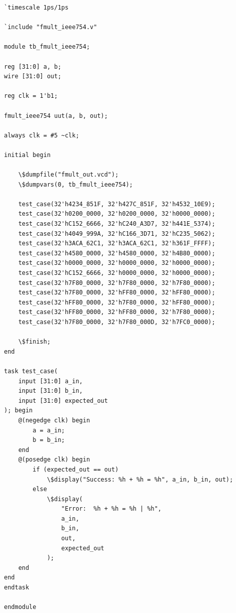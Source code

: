 \documentclass{article}
\begin{document}
\begin{lstlisting}
`timescale 1ps/1ps

`include "fmult_ieee754.v"

module tb_fmult_ieee754;

reg [31:0] a, b;
wire [31:0] out;

reg clk = 1'b1;

fmult_ieee754 uut(a, b, out);

always clk = #5 ~clk;

initial begin

	\$dumpfile("fmult_out.vcd");
	\$dumpvars(0, tb_fmult_ieee754);

    test_case(32'h4234_851F, 32'h427C_851F, 32'h4532_10E9);
    test_case(32'h0200_0000, 32'h0200_0000, 32'h0000_0000);
    test_case(32'hC152_6666, 32'hC240_A3D7, 32'h441E_5374);
    test_case(32'h4049_999A, 32'hC166_3D71, 32'hC235_5062);
    test_case(32'h3ACA_62C1, 32'h3ACA_62C1, 32'h361F_FFFF);
    test_case(32'h4580_0000, 32'h4580_0000, 32'h4B80_0000);
    test_case(32'h0000_0000, 32'h0000_0000, 32'h0000_0000);
    test_case(32'hC152_6666, 32'h0000_0000, 32'h0000_0000);
    test_case(32'h7F80_0000, 32'h7F80_0000, 32'h7F80_0000);
    test_case(32'h7F80_0000, 32'hFF80_0000, 32'hFF80_0000);
    test_case(32'hFF80_0000, 32'h7F80_0000, 32'hFF80_0000);
    test_case(32'hFF80_0000, 32'hFF80_0000, 32'h7F80_0000);
    test_case(32'h7F80_0000, 32'h7F80_000D, 32'h7FC0_0000);

    \$finish;
end

task test_case(
    input [31:0] a_in,
    input [31:0] b_in,
    input [31:0] expected_out
); begin
    @(negedge clk) begin
        a = a_in;
        b = b_in;
    end
    @(posedge clk) begin
        if (expected_out == out)
            \$display("Success: %h + %h = %h", a_in, b_in, out);
        else
            \$display(
                "Error:  %h + %h = %h | %h",
                a_in,
                b_in,
                out,
                expected_out
            );
    end
end
endtask

endmodule
\end{lstlisting}


\newpage
{}
{}


\end{document}
